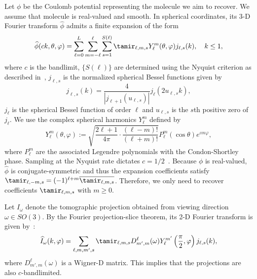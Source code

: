 \documentclass[9pt,twocolumn,twoside,lineno]{pnas-new}
\begin{document}
Let $\phi$ be the Coulomb potential representing the molecule we aim to recover. 
We assume that molecule is real-valued and smooth. In spherical coordinates, its 3-D Fourier transform $\widehat\phi$ admits a finite expansion of the form 
\begin{equation} \label{eq:volume_expansion_app} 
\widehat \phi(ck, \theta, \varphi) = \sum_{\ell = 0}^L\sum_{m=-\ell}^{\ell}\sum_{s=1}^{S(\ell)}\tamir_{\ell, m, s}Y_{\ell}^m(\theta,\varphi)j_{\ell,s}(k), \quad k\leq 1,
\end{equation}
where $c$ is the bandlimit, $\{S(\ell)\}$  are determined using the Nyquist criterion as described in~\cite{bhamre2017anisotropic}, $j_{\ell,s}$ is the normalized spherical Bessel functions given by 
\[ j_{\ell, s}(k) = \frac{4}{|j_{\ell+1}(u_{\ell, s})|}j_{\ell}(2u_{\ell,s} k),\]
$j_{\ell}$ is the spherical Bessel function of order $\ell$ and  $u_{\ell,s}$ is the $s$th positive zero of $j_{\ell}$. We use 
the complex spherical harmonics $Y_{\ell}^m$ defined by  
\[ Y_{\ell}^m(\theta,\varphi) := \sqrt{\frac{2\ell+1}{4\pi}\cdot\frac{(\ell-m)!}{(\ell+m)!}}P_{\ell}^m(\cos\theta)e^{\iota m\varphi},\]
where $P_{\ell}^m$ are the associated Legendre polynomials with the Condon-Shortley phase. 
Sampling at the Nyquist rate dictates $c=1/2$~\cite{levin20173d}. 
Because $\phi$ is real-valued,  $\widehat \phi$ is conjugate-symmetric and thus the expansion coefficients satisfy $\tamir_{\ell, -m, s} = (-1)^{\ell+m}\overline{\tamir_{\ell,m,s}}$. Therefore, we only need to recover coefficients $\tamir_{\ell, m, s}$ with $m\geq 0$. 

Let $I_{\omega}$ denote the tomographic projection obtained from viewing direction $\omega\in SO(3)$. By the Fourier projection-slice theorem, its 2-D Fourier transform  is given by~\cite{natterer1986mathematics}: 
\begin{equation*}\label{eq:projection_model}
\widehat I_{\omega}(k,\varphi) = \sum_{\ell,m,m',s}\tamir_{\ell,m,s}D_{m',m}^{\ell}(\omega)Y_{\ell}^{m'}\left(\frac{\pi}{2},\varphi\right)j_{\ell,s}(k),
\end{equation*}
where $D_{m',m}^{\ell}(\omega)$ is a Wigner-D matrix. This implies that the projections are also $c$-bandlimited.
\end{document}
